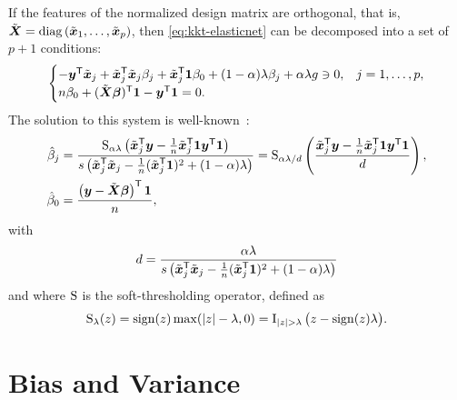 If the features of the normalized design matrix are orthogonal, that is, \(\tilde{\boldsymbol{X}} = \operatorname{diag}\left(\tilde{\boldsymbol{x}}_1, \dots, \tilde{\boldsymbol{x}}_p\right) \), then \eqref{eq:kkt-elasticnet} can be decomposed into a set of \(p + 1\) conditions:
\[
  \begin{cases}
    -\boldsymbol{y}^{\mathsf{T}} \tilde{\boldsymbol{x}}_j + \tilde{\boldsymbol{x}}_j^{\mathsf{T}} \tilde{\boldsymbol{x}}_j \beta_j + \tilde{\boldsymbol{x}}_j^{\mathsf{T}} \boldsymbol{1} \beta_0 + (1 - \alpha) \lambda \beta_j + \alpha \lambda g \ni 0, & j=1,\dots,p, \\
    n \beta_0 + (\tilde{\boldsymbol{X}}\boldsymbol{\beta})^{\mathsf{T}} \boldsymbol{1} -  \boldsymbol{y}^{\mathsf{T}} \boldsymbol{1} = 0.
  \end{cases}
\]
The solution to this system is well-known~\parencite{donoho1994}:
\begin{align}
  \hat\beta_j & = \frac{\operatorname{S}_{\alpha\lambda}\left(\tilde{\boldsymbol{x}}_j^{\mathsf{T}} \boldsymbol{y} - \frac{1}{n} \tilde{\boldsymbol{x}}_j^{\mathsf{T}} \boldsymbol{1} \boldsymbol{y}^{\mathsf{T}} \boldsymbol{1}\right)}{s\left(\tilde{\boldsymbol{x}}_j^{\mathsf{T}} \tilde{\boldsymbol{x}}_j - \frac{1}{n}(\tilde{\boldsymbol{x}}_j^{\mathsf{T}} \boldsymbol{1})^2 + (1 - \alpha) \lambda\right)}\label{eq:orthogonal-solution} = \operatorname{S}_{\alpha\lambda/d}\left(\frac{\tilde{\boldsymbol{x}}_j^{\mathsf{T}} \boldsymbol{y} - \frac{1}{n} \tilde{\boldsymbol{x}}_j^{\mathsf{T}} \boldsymbol{1} \boldsymbol{y}^{\mathsf{T}} \boldsymbol{1}}{d}\right), \\
  \hat\beta_0 & = \frac{\left(\boldsymbol{y} - \tilde{\boldsymbol{X}}\boldsymbol{\beta}\right)^{\mathsf{T}} \boldsymbol{1}}{n},
\end{align}
with
\[
  d = \frac{\alpha\lambda}{s\left(\tilde{\boldsymbol{x}}_j^{\mathsf{T}} \tilde{\boldsymbol{x}}_j - \frac{1}{n}(\tilde{\boldsymbol{x}}_j^{\mathsf{T}} \boldsymbol{1})^2 + (1 - \alpha)\lambda\right)}
\]
and where \(\operatorname{S}\) is the soft-thresholding operator, defined as
\[
  \st_\lambda(z) = \sign(z) \max(|z| - \lambda, 0) = \ind{|z|>\lambda}\big(z - \sign(z)\lambda\big).
\]

\section{Bias and Variance}


